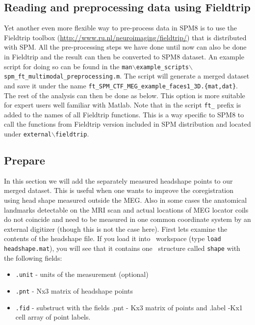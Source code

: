 \subsection{Reading and preprocessing data using Fieldtrip}
Yet another even more flexible way to pre-process data in SPM8 is to use the Fieldtrip toolbox (\url{http://www.ru.nl/neuroimaging/fieldtrip/}) that is distributed with SPM. All the pre-processing steps we have done until now can also be done in Fieldtrip and the result can then be converted to SPM8 dataset. An example script for doing so can be found in the 
\texttt{man$\backslash$example\_scripts$\backslash$spm\_ft\_multimodal\_preprocessing.m}. The script will generate a merged dataset and save it under the name \texttt{ft\_SPM\_CTF\_\-MEG\_\-example\_\-faces1\_\-3D.\{mat,dat\}}. The rest of the analysis can then be done as below. This option is more suitable for expert users well familiar with Matlab. Note that in the script \texttt{ft\_} prefix is added to the names of all Fieldtrip functions. This is a way specific to SPM8 to call the functions from Fieldtrip version included in SPM distribution and located under \texttt{external$\backslash$fieldtrip}.

\subsection{Prepare}

In this section we will add the separately measured headshape points to our merged dataset. This is useful when one wants to improve the coregistration using head shape measured outside the MEG. Also in some cases the anatomical landmarks detectable on the MRI scan and actual locations of MEG locator coils do not coincide and need to be measured in one common coordinate system by an external digitizer (though this is not the case here). First lets examine the contents of the headshape file. If you load it into \matlab\ workspace (type \texttt{load headshape.mat}), you will see that it contains one \matlab\ structure called \texttt{shape} with the following fields:
\begin{itemize}
\item \texttt{.unit} - units of the measurement (optional)
\item \texttt{.pnt} - Nx3 matrix of headshape points
\item \texttt{.fid} - substruct with the fields .pnt - Kx3 matrix of points and .label -Kx1 cell array of point labels.
\end{itemize}

